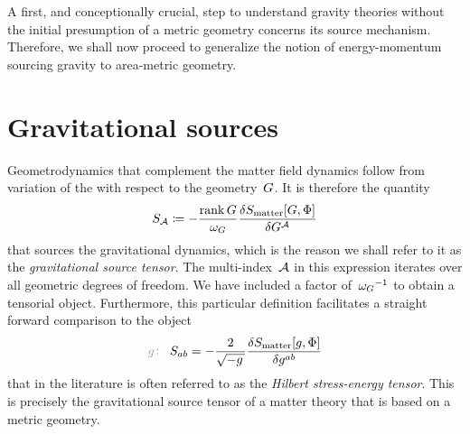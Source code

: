 A first, and conceptionally crucial, step to understand gravity theories without the initial presumption of a metric geometry concerns its source mechanism. Therefore, we shall now proceed to generalize the notion of energy-momentum sourcing gravity to area-metric geometry.

\section{Gravitational sources}\label{sec:grav_sources}


Geometrodynamics that complement the matter field dynamics follow from variation of the  with respect to the geometry~$G$. It is therefore the quantity
\begin{equation}\label{eq:sourcet}
	S_{\mathcal{A}}\coloneqq-\frac{\operatorname{rank}{G}}{\omega_G}\frac{\delta S_\mathrm{matter}[G,\Phi]}{\delta G^{\mathcal{A}}}
\end{equation}
that sources the gravitational dynamics, which is the reason we shall refer to it as the \emph{gravitational source tensor}. The multi-index~$\mathcal{A}$ in this expression iterates over all geometric degrees of freedom. We have included a factor of~${\omega_G}^{-1}$ to obtain a tensorial object. Furthermore, this particular definition facilitates a straight forward comparison to the object
\begin{equation}\label{eq:sourcet_met}
	\metind\sourcet_{ab}=-\frac{2}{\sqrtmet}\functderiv{\actmatter[\met,\matterfields]}{\met^{ab}}
\end{equation}
that in the literature is often referred to as the \emph{Hilbert stress-energy tensor}. This is precisely the gravitational source tensor of a matter theory that is based on a metric geometry.



